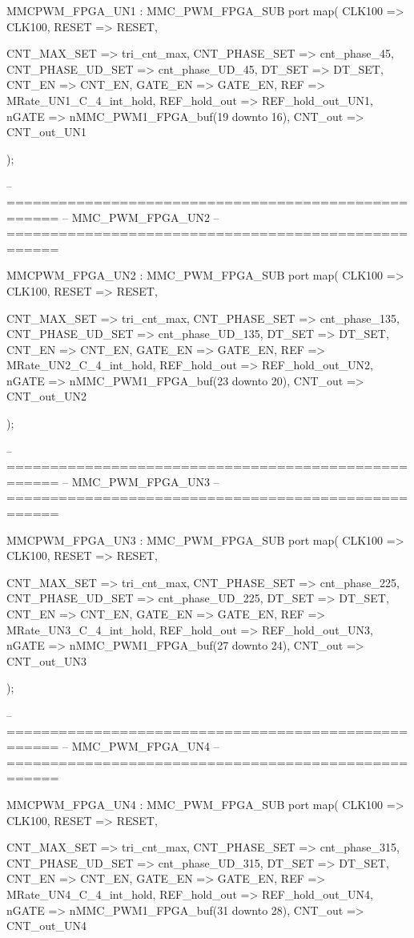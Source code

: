 \begin{mylisting}[language=VHDL,caption=ゲート信号出力モジュール,label=MMC_PWM_GEN_module_VHDL]
	MMCPWM_FPGA_UN1 : MMC_PWM_FPGA_SUB
		port map(
		CLK100				=> CLK100,
		RESET					=> RESET,
		
		CNT_MAX_SET			=> tri_cnt_max,
		CNT_PHASE_SET		=> cnt_phase_45,
		CNT_PHASE_UD_SET	=> cnt_phase_UD_45,
		DT_SET				=> DT_SET,
		CNT_EN				=> CNT_EN,
		GATE_EN				=> GATE_EN,
		REF					=> MRate_UN1_C_4_int_hold,
		REF_hold_out		=> REF_hold_out_UN1,
		nGATE					=> nMMC_PWM1_FPGA_buf(19 downto 16),
		CNT_out				=> CNT_out_UN1

			);
			
-- ====================================================
-- MMC_PWM_FPGA_UN2
-- ====================================================

	MMCPWM_FPGA_UN2 : MMC_PWM_FPGA_SUB
		port map(
		CLK100				=> CLK100,
		RESET					=> RESET,
		
		CNT_MAX_SET			=> tri_cnt_max,
		CNT_PHASE_SET		=> cnt_phase_135,
		CNT_PHASE_UD_SET	=> cnt_phase_UD_135,
		DT_SET				=> DT_SET,
		CNT_EN				=> CNT_EN,
		GATE_EN				=> GATE_EN,
		REF					=> MRate_UN2_C_4_int_hold,
		REF_hold_out		=> REF_hold_out_UN2,
		nGATE					=> nMMC_PWM1_FPGA_buf(23 downto 20),
		CNT_out				=> CNT_out_UN2

			);


-- ====================================================
-- MMC_PWM_FPGA_UN3
-- ====================================================

	MMCPWM_FPGA_UN3 : MMC_PWM_FPGA_SUB
		port map(
		CLK100				=> CLK100,
		RESET					=> RESET,
		
		CNT_MAX_SET			=> tri_cnt_max,
		CNT_PHASE_SET		=> cnt_phase_225,
		CNT_PHASE_UD_SET	=> cnt_phase_UD_225,
		DT_SET				=> DT_SET,
		CNT_EN				=> CNT_EN,
		GATE_EN				=> GATE_EN,
		REF					=> MRate_UN3_C_4_int_hold,
		REF_hold_out		=> REF_hold_out_UN3,
		nGATE					=> nMMC_PWM1_FPGA_buf(27 downto 24),
		CNT_out				=> CNT_out_UN3

			);

-- ====================================================
-- MMC_PWM_FPGA_UN4
-- ====================================================

	MMCPWM_FPGA_UN4 : MMC_PWM_FPGA_SUB
		port map(
		CLK100				=> CLK100,
		RESET					=> RESET,
		
		CNT_MAX_SET			=> tri_cnt_max,
		CNT_PHASE_SET		=> cnt_phase_315,
		CNT_PHASE_UD_SET	=> cnt_phase_UD_315,
		DT_SET				=> DT_SET,
		CNT_EN				=> CNT_EN,
		GATE_EN				=> GATE_EN,
		REF					=> MRate_UN4_C_4_int_hold,
		REF_hold_out		=> REF_hold_out_UN4,
		nGATE					=> nMMC_PWM1_FPGA_buf(31 downto 28),
		CNT_out				=> CNT_out_UN4


\end{mylisting}
